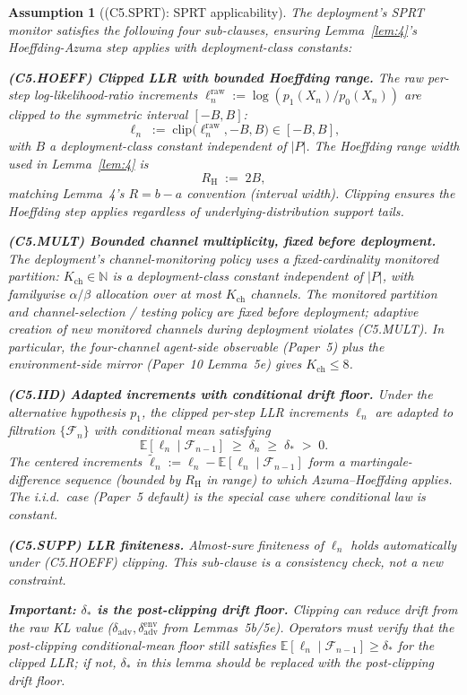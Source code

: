 \documentclass{article}
\newtheorem{assumption}{Assumption}
\newcommand{\deltastar}{\delta_{*}}
\newcommand{\Bclip}{B}
\newcommand{\Rh}{R_{\mathrm{H}}}
\newcommand{\Kch}{K_{\mathrm{ch}}}
\begin{document}
\begin{assumption}[(C5.SPRT): SPRT applicability]
\label{ass:C5SPRT}
The deployment's SPRT monitor satisfies the following four
sub-clauses, ensuring Lemma~\ref{lem:4}'s Hoeffding-Azuma step
applies with deployment-class constants:

\textbf{(C5.HOEFF) Clipped LLR with bounded Hoeffding range.}  The
raw per-step log-likelihood-ratio increments
$\ell_n^{\mathrm{raw}} := \log(p_1(X_n)/p_0(X_n))$ are clipped to
the symmetric interval $[-\Bclip, \Bclip]$:
\[
  \ell_n \;:=\; \mathrm{clip}\bigl(\ell_n^{\mathrm{raw}}, -\Bclip,
  \Bclip\bigr) \in [-\Bclip, \Bclip],
\]
with $\Bclip$ a deployment-class constant independent of $|P|$.
The Hoeffding range width used in Lemma~\ref{lem:4} is
\[
  \Rh \;:=\; 2\Bclip,
\]
matching Lemma~4's $R = b - a$ convention (interval width).
Clipping ensures the Hoeffding step applies regardless of
underlying-distribution support tails.

\textbf{(C5.MULT) Bounded channel multiplicity, fixed before
deployment.}  The deployment's channel-monitoring policy uses a
fixed-cardinality monitored partition: $\Kch \in \mathbb{N}$ is a
deployment-class constant independent of $|P|$, with familywise
$\alpha/\beta$ allocation over at most $\Kch$ channels.  The
monitored partition and channel-selection / testing policy are
fixed \emph{before} deployment; adaptive creation of new monitored
channels during deployment violates (C5.MULT).  In particular, the
four-channel agent-side observable (Paper~5) plus the
environment-side mirror (Paper~10 Lemma~5e) gives $\Kch \leq 8$.

\textbf{(C5.IID) Adapted increments with conditional drift floor.}
Under the alternative hypothesis $p_1$, the clipped per-step LLR
increments $\ell_n$ are adapted to filtration
$\{\mathcal{F}_n\}$ with conditional mean satisfying
\[
  \mathbb{E}[\ell_n \mid \mathcal{F}_{n-1}] \;\geq\; \delta_n
  \;\geq\; \deltastar \;>\; 0.
\]
The centered increments $\tilde\ell_n := \ell_n -
\mathbb{E}[\ell_n \mid \mathcal{F}_{n-1}]$ form a
martingale-difference sequence (bounded by $\Rh$ in range) to
which Azuma--Hoeffding applies.  The i.i.d.\ case (Paper~5
default) is the special case where conditional law is constant.

\textbf{(C5.SUPP) LLR finiteness.}  Almost-sure finiteness of
$\ell_n$ holds automatically under (C5.HOEFF) clipping.  This
sub-clause is a consistency check, not a new constraint.

\textbf{Important: $\deltastar$ is the post-clipping drift floor.}
Clipping can reduce drift from the raw KL value
($\delta_{\mathrm{adv}}, \delta_{\mathrm{adv}}^{\mathrm{env}}$
from Lemmas~5b/5e).  Operators must verify that the post-clipping
conditional-mean floor still satisfies $\mathbb{E}[\ell_n \mid
\mathcal{F}_{n-1}] \geq \deltastar$ for the clipped LLR; if not,
$\deltastar$ in this lemma should be replaced with the post-clipping
drift floor.
\end{assumption}
\end{document}
